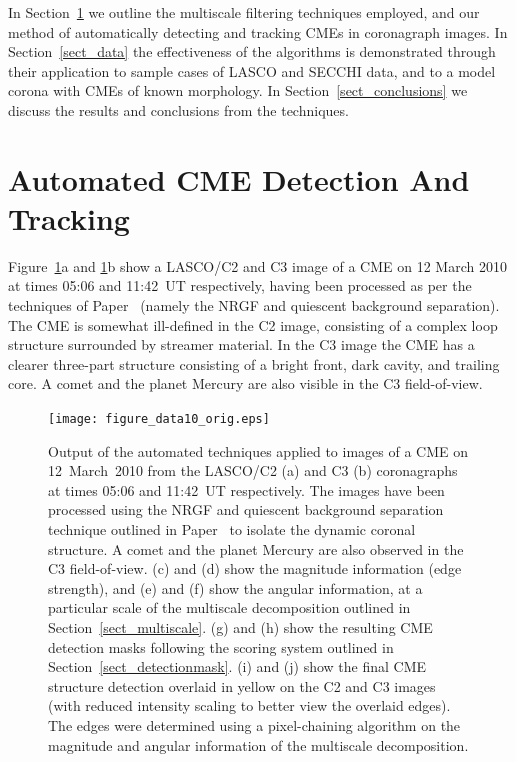 \documentclass[preprint2]{aastex}
\newcommand{\RNum}[1]{\uppercase\expandafter{\romannumeral #1\relax}}
\begin{document}
In Section~\ref{sect_automation} we outline the multiscale filtering techniques employed, and our method of automatically detecting and tracking CMEs in coronagraph images. In Section~\ref{sect_data} the effectiveness of the algorithms is demonstrated through their application to sample cases of LASCO and SECCHI data, and to a model corona with CMEs of known morphology. In Section~\ref{sect_conclusions} we discuss the results and conclusions from the techniques.


\section{Automated CME Detection And Tracking}
\label{sect_automation}

Figure~\ref{figure_data10}a and \ref{figure_data10}b show a LASCO/C2 and C3 image of a CME on 12 March 2010 at times 05:06 and 11:42~UT respectively, having been processed as per the techniques of Paper~\RNum{1} (namely the NRGF and quiescent background separation). The CME is somewhat ill-defined in the C2 image, consisting of a complex loop structure surrounded by streamer material. In the C3 image the CME has a clearer three-part structure consisting of a bright front, dark cavity, and trailing core. A comet and the planet Mercury are also visible in the C3 field-of-view. %
  

\begin{figure}[!t]
\centerline{\texttt{[image: figure\_data10\_orig.eps]}}
\caption{Output of the automated techniques applied to images of a CME on 12~March~2010 from the LASCO/C2 (a) and C3 (b) coronagraphs at times 05:06 and 11:42~UT respectively. The images have been processed using the NRGF and quiescent background separation technique outlined in Paper~\RNum{1} to isolate the dynamic coronal structure. A comet and the planet Mercury are also observed in the C3 field-of-view. (c) and (d) show the magnitude information (edge strength), and (e) and (f) show the angular information, at a particular scale of the multiscale decomposition outlined in Section~\ref{sect_multiscale}. (g) and (h) show the resulting CME detection masks following the scoring system outlined in Section~\ref{sect_detectionmask}. (i) and (j) show the final CME structure detection overlaid in yellow on the C2 and C3 images (with reduced intensity scaling to better view the overlaid edges). The edges were determined using a pixel-chaining algorithm on the magnitude and angular information of the multiscale decomposition.}
\label{figure_data10}
\end{figure}
\end{document}

